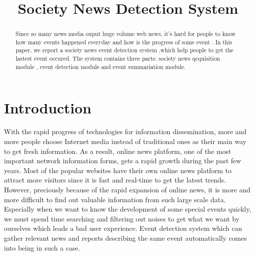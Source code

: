 \documentclass[conference]{IEEEtran}
\begin{document}
%
\title{Society News Detection System}


\author{
\and
{}
\and
{}
}


\maketitle


\begin{abstract}
Since so many news media ouput huge volume web news, it's hard for people to know how many events happened everyday and how is the progress of some event . In this paper, we report a society news event detection system ,which help people to get the lastest event occured. The system contains three parts: society news qcquisition module , event detection module and event summariation module.
\end{abstract}

\IEEEpeerreviewmaketitle

\section{Introduction}
With the rapid progress of technologies for information dissemination, more and more people choose Internet media instead of traditional ones as their main way to get fresh information. As a result, online news platform, one of the most important network information forms, gets a rapid growth during the past few years. Most of the popular websites have their own online news platform to attract more visitors since it is fast and real-time to get the latest trends. However, preciously because of the rapid expansion of online news, it is more and more difficult to find out valuable information from such large scale data. Especially when we want to know the development of some special events quickly, we must spend time searching and filtering out noises to get what we want by ourselves which leads a bad user experience. Event detection system which can gather relevant news and reports describing the same event automatically comes into being in such a case.
\end{document}
